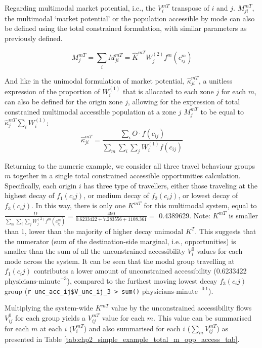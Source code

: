 \documentclass[
11pt, %
oneside, %
english, %
singlespacing, %
]{macthesis} %
\begin{document}
Regarding multimodal market potential, i.e., the \(V_i^{mT}\) transpose of \(i\) and \(j\). \(M^{mT}_{ji}\), the multimodal `market potential' or the population accessible by mode can also be defined using the total constrained formulation, with similar parameters as previously defined.

\begin{equation}
\label{eq:total-constrained-multimodal-market}
M^{mT}_{j} = \sum_i M^{mT}_{ji} = \hat K^{mT} W_j^{(2)} f^m(c^m_{ij})
\end{equation} 

And like in the unimodal formulation of market potential, \(\hat \kappa_{ji}^{mT}\), a unitless expression of the proportion of \(W^{(1)}_i\) that is allocated to each zone \(j\) for each \(m\), can also be defined for the origin zone \(j\), allowing for the expression of total constrained multimodal accessible population at a zone \(j\) \(M^{mT}_j\) to be equal to \(\hat \kappa_j^{mT}\sum_i W^{(1)}_i\):
\[
\hat \kappa_{ji}^{mT} = \frac{\sum_i O \cdot f(c_{ij})}{\sum_m\sum_i\sum_j W^{(1)}_if(c_{ij})}
\]

Returning to the numeric example, we consider all three travel behaviour groups \(m\) together in a single total constrained accessible opportunities calculation. Specifically, each origin \(i\) has three type of travellers, either those traveling at the highest decay of \(f_1 (c_ij)\), or medium decay of \(f_2(c_ij)\), or lowest decay of \(f_3(c_ij)\). In this way, there is only one \(K^{mT}\) for this multimodal system, equal to \(\frac{D}{\sum_m\sum_i\sum_j W^{(2)}_jf^m(c^m_{ij})} = \frac{490}{0.6233422 + 7.283556 + 1108.361}=\) 0.4389629. Note: \(K^{mT}\) is smaller than 1, lower than the majority of higher decay unimodal \(K^T\). This suggests that the numerator (sum of the destination-side marginal, i.e., opportunities) is smaller than the sum of all the unconstrained accessibility \(V^{0}_i\) values for each mode across the system. It can be seen that the modal group travelling at \(f_1 (c_ij)\) contributes a lower amount of unconstrained accessibility (0.6233422 \(\text{physicians-minute}^{-3}\)), compared to the furthest moving lowest decay \(f_3(c_ij)\) group (\texttt{r\ unc\_acc\_ij\$V\_unc\_ij\_3\ \textbar{}\textgreater{}\ sum()} \(\text{physicians-minute}^{-0.1}\)).

Multiplying the system-wide \(K^{mT}\) value by the unconstrained accessibility flows \(V^{0}_{ij}\) for each group yields a \(V^{mT}_{ij}\) value for each \(m\). This value can be summarised for each \(m\) at each \(i\) (\(V^{mT}_{i}\)) and also summarised for each \(i\) (\(\sum_m V^{mT}_{ij}\)) as presented in Table \ref{tab:chp2_simple_example_total_m_opp_access_tab}.
\end{document}
